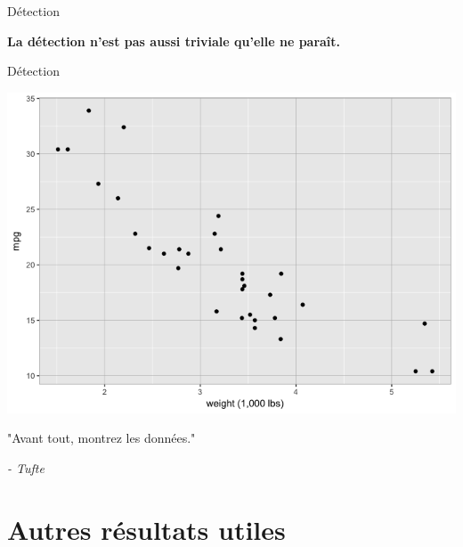 \documentclass[french]{beamer}
\begin{document}
\begin{frame}{Détection}
\begin{center}\begin{Huge}\textbf{
			La détection n'est pas aussi triviale qu'elle ne paraît.
}\end{Huge}\end{center}
\end{frame}

\begin{frame}{Détection}
\begin{center}
	\includegraphics[height=0.8\textheight]{det7}
\end{center}
\end{frame}

\begin{frame}{}
\begin{Large}
	"Avant tout, montrez les données."
	
	\vspace{1cm}
	\textit{- Tufte}
\end{Large}
\end{frame}

\section{Autres résultats utiles}
\end{document}
